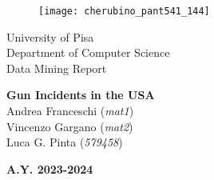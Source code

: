 \begin{titlepage}
	\begin{figure}[!htb]
		\centering
		\texttt{[image: cherubino\_pant541\_144]}
	\end{figure}
	
	\begin{center}
		\LARGE{University of Pisa}
		\vspace{5mm}
		\\ \large{Department of Computer Science }
		\vspace{5mm}
		\\ \LARGE{Data Mining Report}
	\end{center}
	
	\vspace{15mm}
	\begin{center}
		{\LARGE{\bf Gun Incidents in the USA}{\\\vspace{15mm}\small Andrea Franceschi (\textit{mat1}) \\ Vincenzo Gargano (\textit{mat2}) \\ Luca G. Pinta (\textit{579458})}}
	\end{center}
	\vspace{30mm}
	
	\begin{center}
		{\normalsize\vspace{3mm}
			\bf \large{A.Y. 2023-2024}}
	\end{center}
	
	
\end{titlepage}